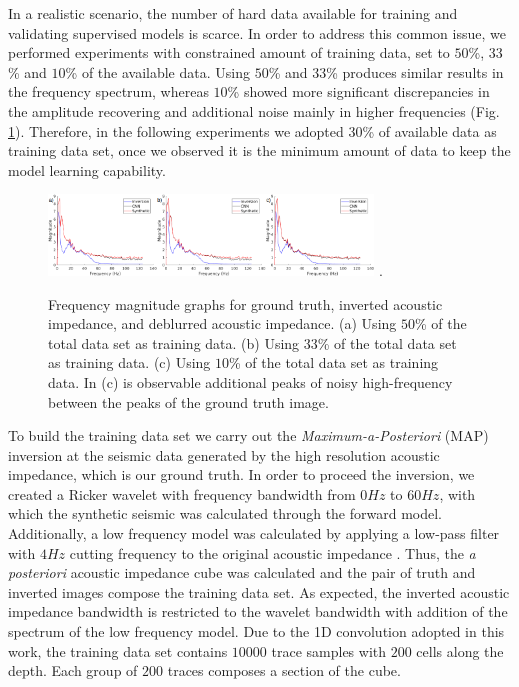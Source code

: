 \documentclass[journal]{IEEEtran}
\begin{document}
In a realistic scenario, the number of hard data available for
training and validating supervised models is scarce. In order
to address this common issue, we performed experiments with
constrained amount of training data, set to $50$\%, $33$\% and
$10$\% of the available data. Using $50$\% and $33$\% 
produces similar results in the frequency spectrum,
whereas $10$\% showed more significant discrepancies in the
amplitude recovering and additional noise mainly in higher frequencies
(Fig. \ref{fig_imgs}). Therefore, in the following experiments
we adopted $30$\% of available data as training data set, once we
observed it is the minimum amount of data to keep the model learning
capability.
\begin{figure}[!t]
\centering
\includegraphics[width=3.4in]{Figs/Images}
\DeclareGraphicsExtensions.
\caption{Frequency magnitude graphs for ground truth, inverted acoustic impedance,
and deblurred acoustic impedance. (a) Using $50$\% of the total data set
as training data. (b) Using $33$\% of the total data set
as training data. (c) Using $10$\% of the total data set
as training data. In (c) is observable additional peaks of noisy high-frequency between the peaks of the
ground truth image.}
\label{fig_imgs}
\end{figure}

To build the training data set we carry out the \textit{Maximum-a-Posteriori} (MAP)
\cite{Buland2003,Figueiredo2012} inversion at the seismic data generated by
the high resolution acoustic impedance, which is our ground truth.
In order to proceed the inversion, we created a Ricker wavelet with
frequency bandwidth from $0Hz$ to $60Hz$, with which the synthetic seismic was
calculated through the forward model. Additionally, a low frequency
model was calculated by applying a low-pass filter with $4Hz$ cutting
frequency to the original acoustic impedance .
Thus, the \textit{a posteriori} acoustic impedance cube was calculated and the pair of truth
and inverted images compose the training data set. As expected, the inverted
acoustic impedance bandwidth is restricted to the wavelet bandwidth with
addition of the spectrum of the low frequency model. Due to the 1D
convolution adopted in this work, the training data set contains $10000$ trace
samples with $200$ cells along the depth. Each group of $200$ traces composes
a section of the cube.
\end{document}
